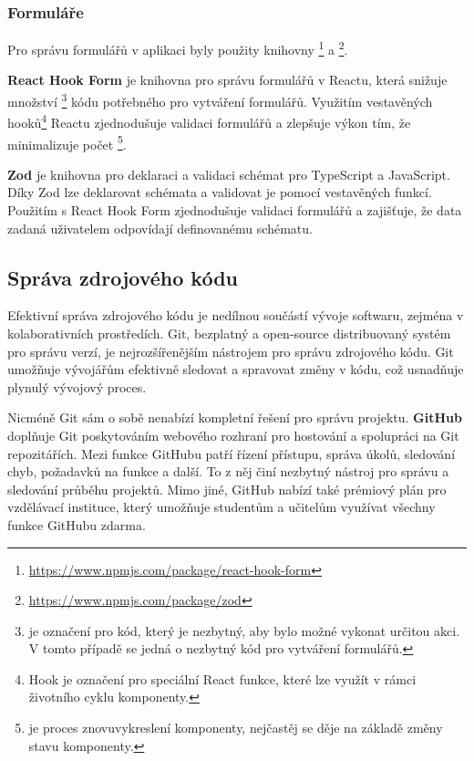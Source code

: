 \subsubsection{Formuláře}
\label{subsubsec:implementace-technologie-ostatni-formulare}
Pro správu formulářů v aplikaci byly použity knihovny \footnote{\url{https://www.npmjs.com/package/react-hook-form}} a \footnote{\url{https://www.npmjs.com/package/zod}}.

\textbf{React Hook Form} je knihovna pro správu formulářů v Reactu, která snižuje množství \footnote{ je označení pro kód, který je nezbytný, aby bylo možné vykonat určitou akci.
V tomto případě se jedná o nezbytný kód pro vytváření formulářů.} kódu potřebného pro vytváření formulářů.
Využitím vestavěných hooků\footnote{Hook je označení pro speciální React funkce, které lze využít v rámci životního cyklu komponenty\cite{fos_projects_react}.} Reactu zjednodušuje validaci formulářů a zlepšuje výkon tím, že minimalizuje počet \footnote{ je proces znovuvykreslení komponenty, nejčastěj se děje na základě změny stavu komponenty.}.

\textbf{Zod} je knihovna pro deklaraci a validaci schémat pro TypeScript a JavaScript.
Díky Zod lze deklarovat schémata a validovat je pomocí vestavěných funkcí.
Použitím s React Hook Form zjednodušuje validaci formulářů a zajišťuje, že data zadaná uživatelem odpovídají definovanému schématu.

\subsection{Správa zdrojového kódu}
\label{subsec:implementace-sprava-zdrojoveho-kodu}
Efektivní správa zdrojového kódu je nedílnou součástí vývoje softwaru, zejména v kolaborativních prostředích.
Git, bezplatný a open-source distribuovaný systém pro správu verzí, je nejrozšířenějším nástrojem pro správu zdrojového kódu.
Git umožňuje vývojářům efektivně sledovat a spravovat změny v kódu, což usnadňuje plynulý vývojový proces\cite{g__git_scm_com}.

Nicméně Git sám o sobě nenabízí kompletní řešení pro správu projektu.
\textbf{GitHub} doplňuje Git poskytováním webového rozhraní pro hostování a spolupráci na Git repozitářích.
Mezi funkce GitHubu patří řízení přístupu, správa úkolů, sledování chyb, požadavků na funkce a další\cite{g_github_com_about}.
To z něj činí nezbytný nástroj pro správu a sledování průběhu projektů.
Mimo jiné, GitHub nabízí také prémiový plán pro vzdělávací instituce, který umožňuje studentům a učitelům využívat všechny funkce GitHubu zdarma\cite{e_education_github_com_pack}.

